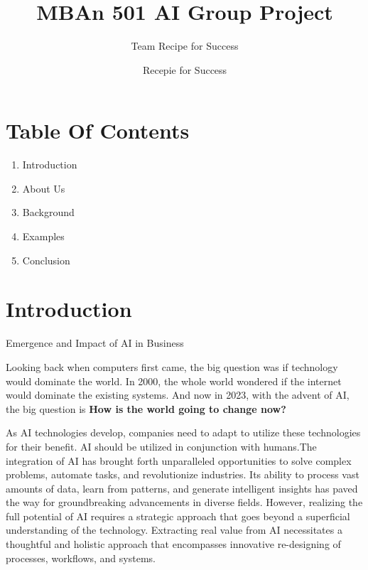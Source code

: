 \documentclass[
]{book}
\title{MBAn 501 AI Group Project}
\subtitle{Team Recipe for Success}
\author{Recepie for Success}
\date{}
\begin{document}
\maketitle

{
\setcounter{tocdepth}{1}
\tableofcontents
}
\hypertarget{table-of-contents}{%
\chapter*{Table Of Contents}\label{table-of-contents}}

\begin{enumerate}
\def\labelenumi{\arabic{enumi}.}
\item
  Introduction
\item
  About Us
\item
  Background
\item
  Examples
\item
  Conclusion
\end{enumerate}

\hypertarget{introduction}{%
\chapter*{Introduction}\label{introduction}}

Emergence and Impact of AI in Business

Looking back when computers first came, the big question was if technology would dominate the world. In 2000, the whole world wondered if the internet would dominate the existing systems. And now in 2023, with the advent of AI, the big question is \textbf{How is the world going to change now?}

As AI technologies develop, companies need to adapt to utilize these technologies for their benefit. AI should be utilized in conjunction with humans.The integration of AI has brought forth unparalleled opportunities to solve complex problems, automate tasks, and revolutionize industries. Its ability to process vast amounts of data, learn from patterns, and generate intelligent insights has paved the way for groundbreaking advancements in diverse fields. However, realizing the full potential of AI requires a strategic approach that goes beyond a superficial understanding of the technology. Extracting real value from AI necessitates a thoughtful and holistic approach that encompasses innovative re-designing of processes, workflows, and systems.
\end{document}
